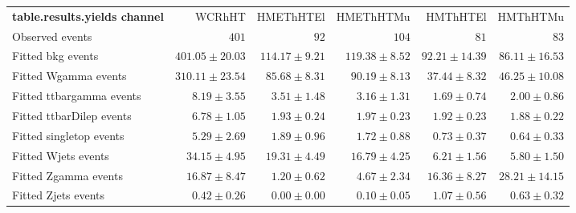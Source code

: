 

\begin{table}
\begin{center}
\setlength{\tabcolsep}{0.0pc}
{\small
\begin{tabular*}{\textwidth}{@{\extracolsep{\fill}}lrrrrr}
\noalign{\smallskip}\hline\noalign{\smallskip}
{\bf table.results.yields channel}           & WCRhHT            & HMEThHTEl            & HMEThHTMu            & HMThHTEl            & HMThHTMu              \\[-0.05cm]
\noalign{\smallskip}\hline\noalign{\smallskip}
Observed events          & $401$              & $92$              & $104$              & $81$              & $83$                    \\
\noalign{\smallskip}\hline\noalign{\smallskip}
Fitted bkg events         & $401.05 \pm 20.03$          & $114.17 \pm 9.21$          & $119.38 \pm 8.52$          & $92.21 \pm 14.39$          & $86.11 \pm 16.53$              \\
\noalign{\smallskip}\hline\noalign{\smallskip}
        Fitted Wgamma events         & $310.11 \pm 23.54$          & $85.68 \pm 8.31$          & $90.19 \pm 8.13$          & $37.44 \pm 8.32$          & $46.25 \pm 10.08$              \\
        Fitted ttbargamma events         & $8.19 \pm 3.55$          & $3.51 \pm 1.48$          & $3.16 \pm 1.31$          & $1.69 \pm 0.74$          & $2.00 \pm 0.86$              \\
        Fitted ttbarDilep events         & $6.78 \pm 1.05$          & $1.93 \pm 0.24$          & $1.97 \pm 0.23$          & $1.92 \pm 0.23$          & $1.88 \pm 0.22$              \\
        Fitted singletop events         & $5.29 \pm 2.69$          & $1.89 \pm 0.96$          & $1.72 \pm 0.88$          & $0.73 \pm 0.37$          & $0.64 \pm 0.33$              \\
        Fitted Wjets events         & $34.15 \pm 4.95$          & $19.31 \pm 4.49$          & $16.79 \pm 4.25$          & $6.21 \pm 1.56$          & $5.80 \pm 1.50$              \\
        Fitted Zgamma events         & $16.87 \pm 8.47$          & $1.20 \pm 0.62$          & $4.67 \pm 2.34$          & $16.36 \pm 8.27$          & $28.21 \pm 14.15$              \\
        Fitted Zjets events         & $0.42 \pm 0.26$          & $0.00 \pm 0.00$          & $0.10 \pm 0.05$          & $1.07 \pm 0.56$          & $0.63 \pm 0.32$              \\

\end{tabular*}}
\end{center}
\end{table}
